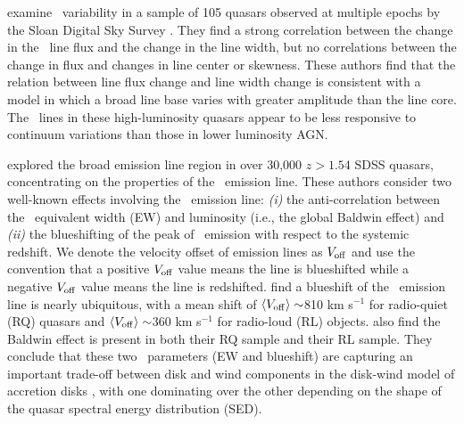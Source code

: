 \documentclass[fleqn,usenatbib]{mnras}
\begin{document}
\citet{Wilhite2006} examine \civ\ variability in a sample of 105
quasars observed at multiple epochs by the Sloan Digital Sky Survey
\citep[SDSS;][]{York2000, Stoughton2002, Abazajian2009}.  They find a
strong correlation between the change in the \civ\ line flux and the
change in the line width, but no correlations between the change in
flux and changes in line center or skewness.  These authors find that
the relation between line flux change and line width change is
consistent with a model in which a broad line base varies with greater
amplitude than the line core. The \civ\ lines in these high-luminosity
quasars appear to be less responsive to continuum variations than
those in lower luminosity AGN.

\citet{Richards2011} explored the broad emission line region in over
30,000 $z > 1.54$ SDSS quasars, concentrating on the properties of the
\civ\ emission line. These authors consider two well-known effects
involving the \civ\ emission line: {\it (i)} the anti-correlation
between the \civ\ equivalent width (EW) and luminosity (i.e., the global 
Baldwin effect) and {\it (ii)} the blueshifting of the peak of \civ\
emission with respect to the systemic redshift.  We denote the
velocity offset of emission lines as $V_{\rm off}$ and use the
convention that a positive $V_{\rm off}$ value means the line is
blueshifted while a negative $V_{\rm off}$ value means the line is
redshifted.  \citet{Richards2011} find a blueshift of the \civ\
emission line is nearly ubiquitous, with a mean shift of $\langle
V_{\rm off}\rangle \sim$810 km s$^{-1}$ for radio-quiet (RQ)
quasars and $\langle V_{\rm off}\rangle \sim$360 km s$^{-1}$
for radio-loud (RL) objects. \citet{Richards2011} also find the
Baldwin effect is present in both their RQ sample and their RL sample.
They conclude that these two \civ\ parameters (EW and blueshift) are
capturing an important trade-off between disk and wind components in
the disk-wind model of accretion disks \citep[e.g.,][]{Murray1995,
Elvis2000, Proga2000, Leighly2004b}, with one dominating over the
other depending on the shape of the quasar spectral energy
distribution (SED).
\end{document}
